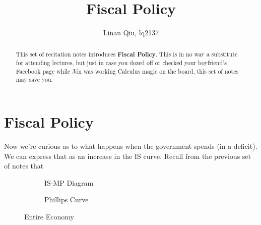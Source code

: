\documentclass[11pt]{scrartcl}
\title{Fiscal Policy}
\author{Linan Qiu, lq2137}
\newcommand{\jon}{J\'{o}n }
\newcommand{\og}{\ensuremath{\tilde{Y}}}
\begin{document}
\maketitle

\begin{abstract}
This set of recitation notes introduces \textbf{Fiscal Policy}. This is in no way a substitute for attending lectures, but just in case you dozed off or checked your boyfriend's Facebook page while \jon was working Calculus magic on the board, this set of notes may save you.
\end{abstract}

\section{Fiscal Policy}

Now we're curious as to what happens when the government spends (in a deficit). We can express that as an increase in the IS curve. Recall from the previous set of notes that




\begin{figure}[H]
\begin{subfigure}[b]{0.5\textwidth}
\centering
{}
\caption{\color{blue}IS-\color{black}MP Diagram}
\end{subfigure}
\hspace{2ex}
\begin{subfigure}[b]{0.5\textwidth}
\centering
{}
\caption{Phillips Curve}
\end{subfigure}
\caption{Entire Economy}
\end{figure}
\end{document}
